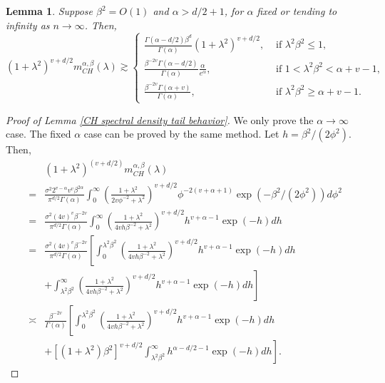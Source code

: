 \documentclass[ejs,noshowframe]{imsart}
\theoremstyle{plain}
\newtheorem{lemma}[theorem]{Lemma}
\theoremstyle{definition}
\theoremstyle{remark}
\begin{document}
\begin{appendix}
\begin{lemma}
Suppose $\beta^2=O(1)$ and $\alpha>d/2+1$, for $\alpha$ fixed or tending to infinity as $n \to \infty$. Then,
$$
(1+\lambda^2)^{v+d/2} m^{\alpha,\beta}_{CH}(\lambda) \gtrsim \left\{\begin{array}{lll}
\frac{\Gamma(\alpha-d/2)\beta^{d}}{\Gamma(\alpha)}(1+\lambda^{2})^{v+d/2},  & \text { if } \lambda^2 \beta^{2} \leq 1, \\
\frac{\beta^{-2v}\Gamma(\alpha-d/2)}{\Gamma(\alpha)}\frac{\alpha}{e^\alpha}, & \text { if } 1 < \lambda^2 \beta^{2} < \alpha+v-1,\\
\frac{\beta^{-2v}\Gamma(\alpha+v)}{\Gamma(\alpha)},& \text { if } \lambda^2 \beta^{2} \geq  \alpha+v-1.
\end{array}\right.
$$
\end{lemma}
\begin{proof}[Proof of Lemma \ref{CH spectral density tail behavior}] 
We only prove the $\alpha \to \infty$ case. The fixed $\alpha$ case can be proved by the same method. Let $ h=\beta^2/(2\phi^2)$. Then,
\begin{equation}\label{spectral density expansion}
\begin{split}
&(1+\lambda^2)^{(v+d/2)}m^{\alpha,\beta}_{CH}(\lambda) \\
=&  \frac{\sigma^2 2^{v-\alpha} v^v \beta^{2\alpha}}{\pi^{d/2}\Gamma(\alpha)}\int_0^{\infty} \left(\frac{1+\lambda^2}{2v\phi^{-2}+\lambda^2}\right)^{v+d/2}  \phi^{-2(v+\alpha+1)} \exp{(-\beta^2/(2\phi^2))d\phi^2}  \\
=&  \frac{\sigma^2  {(4v)}^v \beta^{-2v}}{\pi^{d/2}\Gamma(\alpha)}\int_0^{\infty} \left(\frac{1+\lambda^{2}}{4vh \beta^{-2}+\lambda^{2}}\right)^{v+d/2}  h^{v+\alpha-1} \exp(-h) dh\\
=&  \frac{\sigma^2  {(4v)}^v \beta^{-2v}}{\pi^{d/2}\Gamma(\alpha)} \left[\int_0^{\lambda^2\beta^2} \left(\frac{1+\lambda^{2}}{4vh \beta^{-2}+\lambda^{2}}\right)^{v+d/2}  h^{v+\alpha-1} \exp(-h) dh\right.
\\
&+\left.\int_{\lambda^2\beta^2}^{\infty} \left(\frac{1+\lambda^{2}}{4vh \beta^{-2}
+\lambda^{2}}\right)^{v+d/2}  h^{v+\alpha-1} \exp(-h) dh \right]\\
\asymp& \frac{\beta^{-2v}}{\Gamma(\alpha)} \left[\int_0^{\lambda^2\beta^2} \left(\frac{1+\lambda^{2}}{4vh \beta^{-2}+\lambda^{2}}\right)^{v+d/2}  h^{v+\alpha-1} \exp(-h) dh\right.
\\
&+\left.[(1+\lambda^{2})\beta^{2}]^{v+d/2}\int_{\lambda^2\beta^2}^{\infty} h^{\alpha-d/2-1} \exp(-h) dh \right].
\end{split}
\end{equation}

\end{proof}
\end{appendix}
\end{document}
